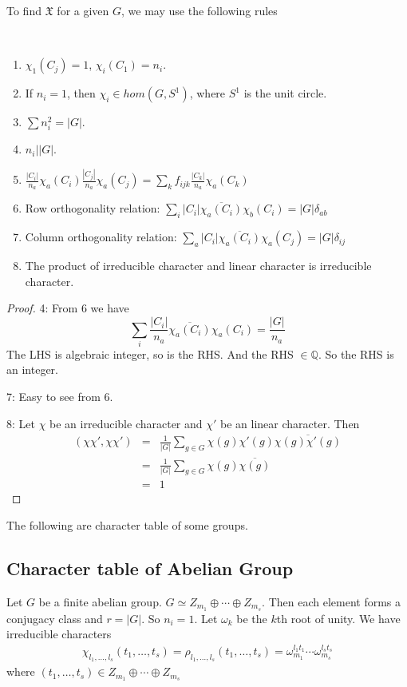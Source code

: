\documentclass[12pt]{book}
\begin{document}
	To find $\mathfrak X$ for a given $G$, we may use the following rules
	\begin{theorem}
		\
		\begin{enumerate}
			\item $\chi_1(C_j)=1$, $\chi_i(C_1)=n_i$.
			\item If $n_i=1$, then $\chi_i\in hom(G,S^1)$, where $S^1$ is the unit circle.
			\item $\sum n_i^2=|G|$.
			\item $n_i\big| |G|$.
			\item $\frac {|C_i|} {n_a} \chi_a(C_i)\frac {|C_j|} {n_a} \chi_a(C_j)=\sum_kf_{ijk}\frac {|C_k|} {n_a } \chi_a(C_k)$
			\item Row orthogonality relation: $\sum_i |C_i|\overline{\chi_a(C_i)}\chi_b(C_i)=|G|\delta_{ab}$
			\item Column orthogonality relation: $\sum_a |C_i|\overline{\chi_a(C_i)}\chi_a(C_j)=|G|\delta_{ij}$
			\item The product of irreducible character and linear character is irreducible character.
		\end{enumerate}
	\end{theorem}
	\begin{proof}
		4: From 6 we have
		\begin{equation}
			\sum_i \frac{|C_i|}{n_a}\overline{\chi_a(C_i)}\chi_a(C_i)=\frac{|G|}{n_a}
		\end{equation}
		The LHS is algebraic integer, so is the RHS. And the RHS $\in \mathbb Q$. So the RHS is an integer.
		
		7: Easy to see from 6.
		
		8: Let $\chi$ be an irreducible character and $\chi'$ be an linear character. Then
		\begin{eqnarray}
			(\chi\chi',\chi\chi')&=&\frac 1{|G|}\sum_{g\in G}\chi(g)\chi'(g)\overline{\chi(g)\chi'(g)}\\
			&=&\frac 1{|G|}\sum_{g\in G}\chi(g)\overline{\chi(g)}\\
			&=&1
		\end{eqnarray}
	\end{proof}
	
	The following are character table of some groups.
	\subsection{Character table of Abelian Group}
	Let $G$ be a finite abelian group. $G\simeq Z_{m_1}\oplus \cdots \oplus Z_{m_s}$. Then each element forms a conjugacy class and $r=|G|$. So $n_i=1$. Let $\omega_k$ be the $k$th root of unity. We have irreducible characters
	\begin{eqnarray}
		\chi_{l_1,\dots,l_s}(t_1,\dots,t_s)=\rho_{l_1,\dots,l_s}(t_1,\dots,t_s)=\omega_{m_1}^{l_1t_1}\cdots\omega_{m_s}^{l_st_s}
	\end{eqnarray}
	where $(t_1,\dots,t_s)\in Z_{m_1}\oplus \cdots \oplus Z_{m_s}$
	
\end{document}
